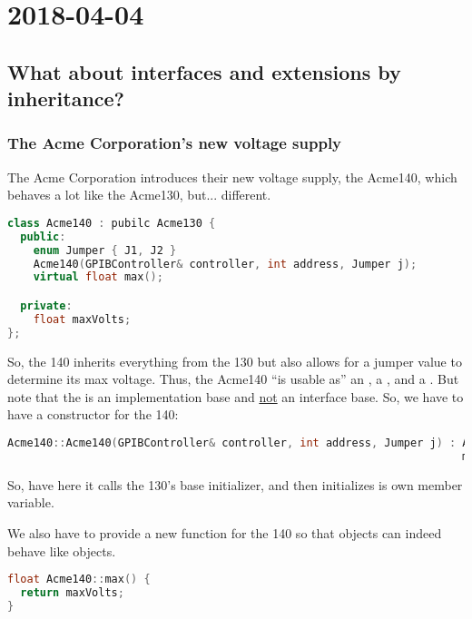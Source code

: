 \section{2018-04-04}

\subsection{What about interfaces and extensions by inheritance?}

\subsubsection{The Acme Corporation's new voltage supply}

The Acme Corporation introduces their new voltage supply, the Acme140, which behaves a lot like the Acme130, but... different.

\begin{lstlisting}[language=C++]
class Acme140 : pubilc Acme130 {
  public:
    enum Jumper { J1, J2 }
    Acme140(GPIBController& controller, int address, Jumper j);
    virtual float max();

  private:
    float maxVolts;
};
\end{lstlisting}

So, the 140 inherits everything from the 130 but also allows for a jumper value to determine its max voltage. Thus, the Acme140 ``is usable as'' an , a , and a . But note that the  is an implementation base and \underline{not} an interface base. So, we have to have a constructor for the 140:

\begin{lstlisting}[language=C++]
Acme140::Acme140(GPIBController& controller, int address, Jumper j) : Acme130(controller, address),
                                                                      maxVolts(j == J1 ? 10 : 50) { }
\end{lstlisting}

So, have here it calls the 130's base initializer, and then initializes is own member variable.

We also have to provide a new  function for the 140 so that  objects can indeed behave like  objects.

\begin{lstlisting}[language=C++]
float Acme140::max() {
  return maxVolts;
}
\end{lstlisting}

